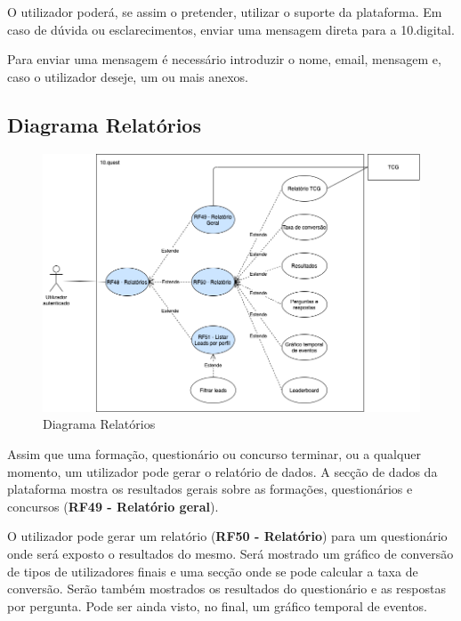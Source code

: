 O utilizador poderá, se assim o pretender, utilizar o suporte da plataforma. Em caso de dúvida ou esclarecimentos, enviar uma mensagem direta para a 10.digital. 

Para enviar uma mensagem é necessário introduzir o nome, email, mensagem e, caso o utilizador deseje, um ou mais anexos.

\newpage

\subsection{Diagrama Relatórios}
\label{d:relatorios}

\begin{figure}[ht!]
	\begin{center}
		\includegraphics[width=1\textwidth]{img/rf/relatorio}
		\caption{Diagrama Relatórios}
		\label{fig:rf-relatorios}
	\end{center}
\end{figure}

Assim que uma formação, questionário ou concurso terminar, ou a qualquer momento, um utilizador pode gerar o relatório de dados. A secção de dados da plataforma mostra os resultados gerais sobre as formações, questionários e concursos (\textbf{RF49 - Relatório geral}). 

O utilizador pode gerar um relatório (\textbf{RF50 - Relatório}) para um questionário onde será exposto o resultados do mesmo. Será mostrado um gráfico de conversão de tipos de utilizadores finais e uma secção onde se pode calcular a taxa de conversão. Serão também mostrados os resultados do questionário e as respostas por pergunta. Pode ser ainda visto, no final, um gráfico temporal de eventos.

